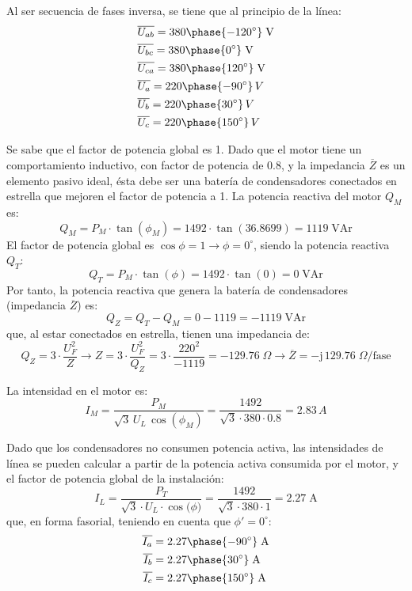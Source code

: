 Al ser secuencia de fases inversa, se tiene que al principio de la
línea:
\begin{align*}
  &\overline{U_{ab}}=380\phase{-120^\circ}\;\text{V} \\
  &\overline{U_{bc}}=380\phase{0^\circ}\;\text{V} \\
  &\overline{U_{ca}}=380\phase{120^\circ}\;\text{V}  \\
  &\overline{U_a}=220\phase{-90^\circ}\,V\\
  &\overline{U_b}=220\phase{30^\circ}\,V\\
  &\overline{U_c}=220\phase{150^\circ}\,V
\end{align*}

Se sabe que el factor de potencia global es 1. Dado que el motor tiene
un comportamiento inductivo, con factor de potencia de $0.8$, y la
impedancia $\overline{Z}$ es un elemento pasivo ideal, {ésta debe ser
  una batería de condensadores} conectados en estrella que mejoren el
factor de potencia a 1. La potencia reactiva del motor $Q_M$ es:
\begin{equation*}
  Q_M=P_M\cdot \tan(\phi_M)=1492\cdot \tan(36.8699)=1119\;\text{VAr}
\end{equation*}
El factor de potencia global es $\cos{\phi}=1\rightarrow\phi=0^\circ$,
siendo la potencia reactiva $Q_T$:
\begin{equation*}
  Q_T=P_M\cdot \tan(\phi)=1492\cdot \tan(0)=0\;\text{VAr}
\end{equation*}
Por tanto, la potencia reactiva que genera la batería de condensadores
(impedancia $\overline{Z}$) es:
\begin{equation*}
  Q_Z=Q_T-Q_M=0-1119=-1119\;\text{VAr}
\end{equation*}
que, al estar conectados en estrella, tienen una impedancia de:
\begin{equation*}
  Q_Z=3\cdot \dfrac{U_F^2}{Z}\rightarrow Z=3\cdot \dfrac{U_F^2}{Q_Z}=3\cdot \dfrac{220^2}{-1119}=-129.76\;\Omega\rightarrow \overline{Z}={-\mathrm{j}\,129.76}\;\Omega\text{/fase}
\end{equation*}

La intensidad en el motor es:
\begin{equation*}
  I_M=\dfrac{P_M}{\sqrt{3}\,U_L\,\cos(\phi_M)}=\dfrac{1492}{\sqrt{3}\cdot 380\cdot 0.8}=2.83\,A
\end{equation*}

Dado que los condensadores no consumen potencia activa, las
intensidades de línea se pueden calcular a partir de la potencia
activa consumida por el motor, y el factor de potencia global de la
instalación:
\begin{equation*}
  I_L=\dfrac{P_T}{\sqrt{3}\cdot U_L\cdot \cos{(\phi})}=\dfrac{1492}{\sqrt{3}\cdot 380\cdot 1}=2.27\;\text{A}
\end{equation*}
que, en forma fasorial, teniendo en cuenta que $\phi'=0^\circ$:
\begin{align*}
  \overline{I_{a}}&={2.27\phase{-90^\circ}\;\text{A}}\\
  \overline{I_{b}}&={2.27\phase{30^\circ}\;\text{A}}\\
  \overline{I_{c}}&={2.27\phase{150^\circ}\;\text{A}}
\end{align*}

